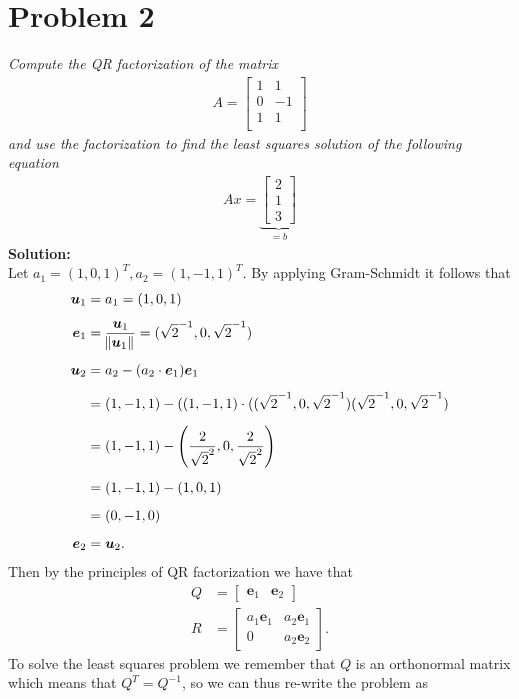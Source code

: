 \documentclass[12pt,
               a4paper,
               article,
               oneside,
               norsk,oldfontcommands]{memoir}
\newcommand{\spaze}{\vspace{4mm}\\}
\begin{document}
\section*{\centering Problem 2}
\emph{Compute the QR factorization of the matrix}
\begin{align*}
A = \begin{bmatrix}
1 & 1 \\[5pt]
0 & -1 \\[5pt]
1 & 1 \\[5pt]
\end{bmatrix}
\end{align*}
\emph{and use the factorization to find the least squares solution of the following equation}
\begin{align*}
Ax = \underbrace{\begin{bmatrix}
2 \\
1 \\
3
\end{bmatrix}}_{=b}
\end{align*}
\textbf{Solution:} \spaze
Let $a_1 = (1, 0, 1)^T, a_2 = (1, -1, 1)^T$. By applying Gram-Schmidt it follows that 
\begin{align*}
\bm{u}_{1} &= a_1 = (1, 0 , 1) \\[5pt]
\bm{e}_{1} &= \frac{\bm{u}_{1}}{\norm{\bm{u}_{1}}} = (\sqrt{2}^{-1}, 0, \sqrt{2}^{-1}) \\[5pt]
\bm{u}_{2} &= a_2 - (a_2 \cdot \bm{e}_{1}) \bm{e}_{1} \\[5pt]
&= (1,-1, 1) - ((1,-1, 1) \cdot ((\sqrt{2}^{-1}, 0, \sqrt{2}^{-1}) (\sqrt{2}^{-1}, 0, \sqrt{2}^{-1}) \\[5pt]
&= (1,-1, 1) - \left( \frac{2}{\sqrt{2}^2}, 0, \frac{2}{\sqrt{2}^2} \right) \\[5pt]
&=  (1,-1, 1) - (1, 0, 1) \\[5pt]
&= (0, -1, 0) \\[5pt]
\bm{e}_2 &= \bm{u}_2.
\end{align*}
Then by the principles of QR factorization we have that 
\begin{align*}
Q &= \begin{bmatrix}
\bm{e}_1 & \bm{e}_2
\end{bmatrix} \\[5pt]
R &= \begin{bmatrix}
a_1 \bm{e}_1  & a_2 \bm{e}_1  \\[5pt]
0 & a_2 \bm{e}_2
\end{bmatrix}.
\end{align*}
To solve the least squares problem we remember that $Q$ is an orthonormal matrix which means that $Q^T = Q^{-1}$, so we can thus re-write the problem as 
\end{document}
